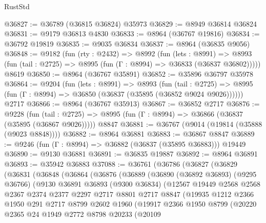 \begin{lexlean}{RustStd}
\begin{coremodule}
@36827 := @36789 (@36815 @36824) @35973
@36829 := @8949 @36814 @36824
@36831 := @9179 @36813 @4830
@36833 := @8964 (@36767 @19816)
@36834 := @36792 @19819
@36835 := @9035 @36834
@36837 := @8964 (@36835 @9056)
@36848 := @9182
    (fun (rty : @2432) =>
    @8992
      (fun (lets : @8991) =>
      @8993 (fun (tail : @2725) => @8995 (fun (Γ : @8994) => @36833 (@36837 @36802)))))
    @8619
@36850 := @8964 (@36767 @35891)
@36852 := @35896 @36797 @35978
@36864 := @9204
    (fun (lets : @8991) =>
    @8993
      (fun (tail : @2725) =>
      @8995 (fun (Γ : @8994) => @36850 (@36837 (@35895 (@36852 @9024 @9026))))))
    @2717
@36866 := @8964 (@36767 @35913)
@36867 := @36852 @2717
@36876 := @9228
    (fun (tail : @2725) => @8995 (fun (Γ : @8994) => @36866 (@36837 (@35895 (@36867 @9026)))))
    @8847
@36881 := @36767 (@9014 (@19814 (@35888 (@9023 @8848))))
@36882 := @8964 @36881
@36883 := @36867 @8847
@36889 := @9246 (fun (Γ : @8994) => @36882 (@36837 (@35895 @36883))) @19449
@36890 := @9130 @36881
@36891 := @36835 @19887
@36892 := @8964 @36891
@36893 := @35942 @36883
@37088 := @36761
    (@36786
      (@36827
        (@36829
          (@36831
            (@36848
              (@36864
                (@36876
                  (@36889
                    (@36890
                      (@36892 @36893)
                      (@9295 @36766)
                      (@9130
                        @36891
                        @36893
                        (@9300 @36834)
                        (@12567
                          @19449
                          @2568
                          @2568
                          @2367
                          @2374
                          @2377
                          @2297
                          @2717
                          @8801
                          @2717
                          @8847
                          (@19935
                            @1212
                            @2366
                            @1950
                            @291
                            @2717
                            @8799
                            @2602
                            @1960
                            (@19917
                              @2366
                              @1950
                              @8799
                              (@20220
                                @2365
                                @24
                                @1949
                                @2772
                                @8798
                                @20233
                                (@20109

\end{coremodule}
\end{lexlean}
